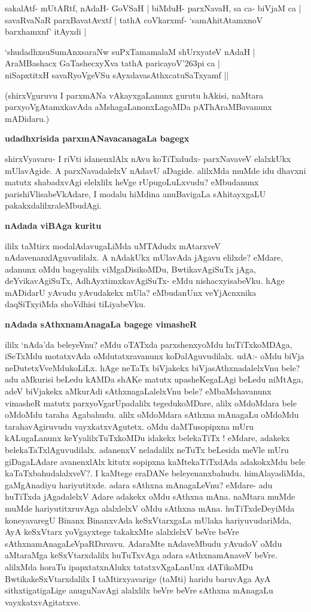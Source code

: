 sakalAtf- mUtARtf, nAdaH- GoVSaH | biMduH- parxNavaH, sa ca- biVjaM ca | savaRvaNaR parxBavatAvxtf | tathA coVkarxmf- `samAhitAtamxnoV barxhamxnf' itAyxdi |

\begin{shloka}
`shudadhxsuSumAnxsaraNw suPxTamamalaM shUrxyateV nAdaH |\\\label{157}
AraMBashacx GaTashecxyXva tathA paricayoV\char'263pi ca |\\\label{157}
niSapxtitxH savaRyoVgeVSu sAyxdavasAthxcatuSaTxyamf ||
\end{shloka}

(shirxVguruvu I parxmANa vAkayxgaLanunx gurutu hAkisi, naMtara parxyoVgAtamxkavAda aMshagaLanonxLagoMDa pAThAraMBavanunx mADidaru.)

{\bf udadhxrisida parxmANavacanagaLa bagegx}\label{page158}

shirxVyavaru- I riVti idanenxlAlx nAvu koTiTxdudx- parxNavaveV elalxkUkx mUlavAgide. A parxNavadalelxV nAdavU aDagide. alilxMda muMde idu dhavxni matutx shabadxvAgi elelxlilx heVge rUpugoLuLxvudu? eMbudanunx parishiVlisabeVkAdare, I modalu hiMdina anuBavigaLa sAhitayxgaLU pakakxdalilxraleMbudAgi.

{\bf nAdada viBAga kuritu}\label{page158}

ililx taMtirx modalAdavugaLiMda uMTAdudx mAtarxveV nAdavenanxlAguvudilalx. A nAdakUkx mUlavAda jAgavu elilxde? eMdare, adanunx oMdu bageyalilx viMgaDisikoMDu, BwtikavAgiSuTx jAga, deYvikavAgiSuTx, AdhAyxtimxkavAgiSuTx- eMdu nishacxyisabeVku. hAge mADidarU yAvudu yAvudakekx mUla? eMbudanUnx veYjAcnxnika daqSiTxyiMda shoVdhisi tiLiyabeVku.

{\bf nAdada sAthxnamAnagaLa bagege vimasheR}\label{page158}

ililx `nAda'da beleyeVnu? eMdu oTATxda parxshenxyoMdu huTiTxkoMDAga, iSeTxMdu motatxvAda oMdutatxravanunx koDalAguvudilalx. udA:- oMdu biVja neDutetxVveMdukoLiLx. hAge neTaTx biVjakekx biVjasAthxnadalelxVnu bele? adu aMkurisi beLedu kAMDa shAKe matutx upasheKegaLAgi beLedu niMtAga, adeV biVjakekx aMkurAdi sAthxnagaLalelxVnu bele? eMbaMshavanunx vimasheR matutx parxyoVgarUpadalilx tegedukoMDare, alilx oMdoMdara bele oMdoMdu taraha Agabahudu. alilx oMdoMdara sAthxna mAnagaLu oMdoMdu tarahavAgiruvudu vayxkatxvAgutetx. oMdu daMTusopipxna mUru kALugaLanunx keYyalilxTuTxkoMDu idakekx belekaTiTx ! eMdare, adakekx belekaTaTxlAguvudilalx. adanenxV neladalilx neTuTx beLesida meVle mUru giDagaLAdare avanenxlAlx kitutx sopipxna kaMtekaTiTxdAda adakokxMdu bele kaTaTxbahudalalxveV?. I kaMtege eraDANe beleyenanxbahudu. himAlayadiMda, gaMgAnadiyu hariyutitxde. adara sAthxna mAnagaLeVnu? eMdare- adu huTiTxda jAgadalelxV Adare adakekx oMdu sAthxna mAna. naMtara muMde muMde hariyutitxruvAga alalxlelxV oMdu sAthxna mAna. huTiTxdeDeyiMda koneyavaregU Binanx BinanxvAda keSxVtarxgaLa mUlaka hariyuvudariMda, AyA keSxVtarx yoVgayxtege takakxMte alalxlelxV beVre beVre sAthxnamAnagaLeVpaRDuvavu. AdaraMte nAdaveMbudu yAvudoV oMdu aMtaraMga keSxVtarxdalilx huTuTxvAga adara sAthxnamAnaveV beVre. alilxMda horaTu ipapxtatxnAlukx tatatxvXgaLanUnx dATikoMDu BwtikakeSxVtarxdalilx I taMtirxyavarige (taMti) haridu baruvAga AyA sithxtigatigaLige anuguNavAgi alalxlilx beVre beVre sAthxna mAnagaLu vayxkatxvAgitatxve.

